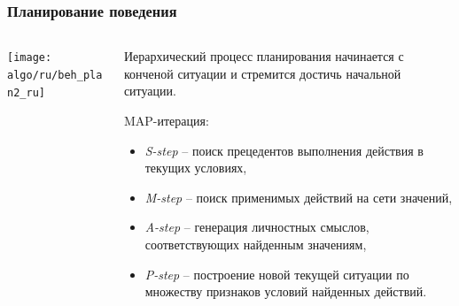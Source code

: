 \documentclass[default]{beamer}
\begin{document}
	\begin{frame}
		\frametitle{Планирование поведения}
		
		\begin{columns}
			\begin{column}{0.6\textwidth}
				\texttt{[image: algo/ru/beh\_plan2\_ru]}
				\vspace{10pt}
				\nocite{*}
				\printbibliography[keyword={plan}, resetnumbers=true]
				\printbibliography[keyword={causnet}]
			\end{column}
			\begin{column}{0.4\textwidth}
				\scriptsize
				Иерархический процесс планирования начинается с конченой ситуации и стремится достичь начальной ситуации.
				\par\bigskip
				MAP-итерация:
				\begin{itemize}
					\item \textit{S-step} -- поиск прецедентов выполнения действия в текущих условиях,
					\item \textit{M-step} -- поиск применимых действий на сети значений,
					\item \textit{A-step} -- генерация личностных смыслов, соответствующих найденным значениям,
					\item \textit{P-step} -- построение новой текущей ситуации по множеству признаков условий найденных действий.
					
				\end{itemize}
			\end{column}
		\end{columns}
	\end{frame}
	
\end{document}
